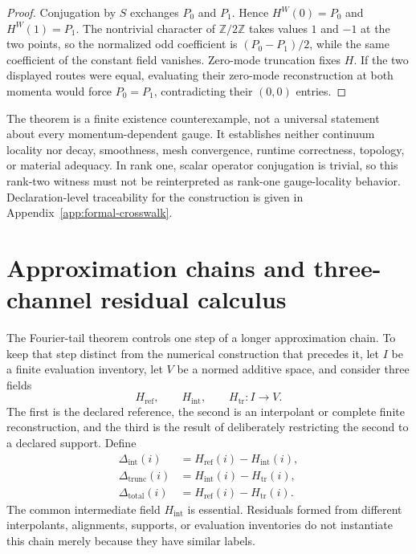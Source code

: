 \begin{proof}
Conjugation by $S$ exchanges $P_0$ and $P_1$.  Hence $H^W(0)=P_0$ and
$H^W(1)=P_1$.  The nontrivial character of $\mathbb Z/2\mathbb Z$ takes values $1$
and $-1$ at the two points, so the normalized odd coefficient is
$(P_0-P_1)/2$, while the same coefficient of the constant field vanishes.  Zero-mode
truncation fixes $H$.  If the two displayed routes were equal, evaluating their
zero-mode reconstruction at both momenta would force $P_0=P_1$, contradicting their
$(0,0)$ entries.
\end{proof}

The theorem is a finite existence counterexample, not a universal statement about every
momentum-dependent gauge.  It establishes neither continuum locality nor decay,
smoothness, mesh convergence, runtime correctness, topology, or material adequacy.  In
rank one, scalar operator conjugation is trivial, so this rank-two witness must not be
reinterpreted as rank-one gauge-locality behavior. Declaration-level traceability for
the construction is given in Appendix~\ref{app:formal-crosswalk}.

\section{Approximation chains and three-channel residual calculus}
\label{sec:three-channel-residual-calculus}

The Fourier-tail theorem controls one step of a longer approximation chain.  To keep
that step distinct from the numerical construction that precedes it, let $I$ be a
finite evaluation inventory, let $V$ be a normed additive space, and consider three
fields
\[
  H_{\mathrm{ref}},\qquad H_{\mathrm{int}},\qquad H_{\mathrm{tr}}:I\to V.
\]
The first is the declared reference, the second is an interpolant or complete finite
reconstruction, and the third is the result of deliberately restricting the second to
a declared support.  Define
\begin{align*}
  \Delta_{\mathrm{int}}(i)
    &=H_{\mathrm{ref}}(i)-H_{\mathrm{int}}(i),\\
  \Delta_{\mathrm{trunc}}(i)
    &=H_{\mathrm{int}}(i)-H_{\mathrm{tr}}(i),\\
  \Delta_{\mathrm{total}}(i)
    &=H_{\mathrm{ref}}(i)-H_{\mathrm{tr}}(i).
\end{align*}
The common intermediate field $H_{\mathrm{int}}$ is essential.  Residuals formed from
different interpolants, alignments, supports, or evaluation inventories do not
instantiate this chain merely because they have similar labels.

